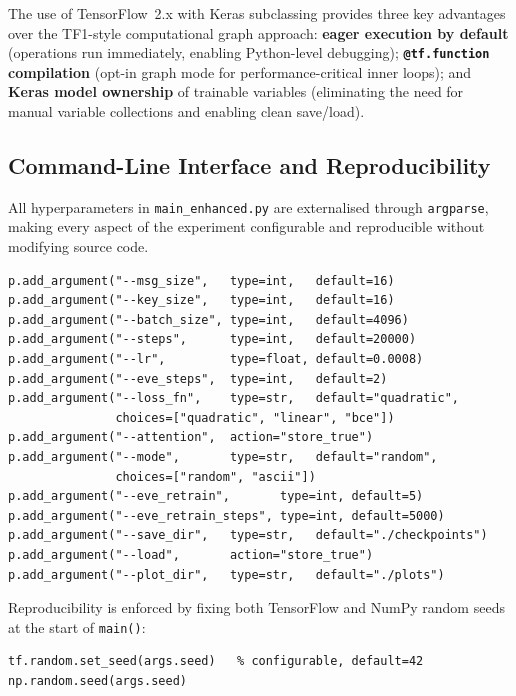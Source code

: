 \documentclass[12pt, a4paper]{article}
\newcommand{\code}[1]{\texttt{\color{CodeRed}#1}}
\begin{document}
\noindent The use of TensorFlow~2.x with Keras subclassing provides
three key advantages over the TF1-style computational graph approach:
\textbf{eager execution by default} (operations run immediately,
enabling Python-level debugging); \textbf{\code{@tf.function}
compilation} (opt-in graph mode for performance-critical inner loops);
and \textbf{Keras model ownership} of trainable variables (eliminating
the need for manual variable collections and enabling clean save/load).

\subsection{Command-Line Interface and Reproducibility}
\label{subsec:cli}

All hyperparameters in \code{main\_enhanced.py} are externalised
through \code{argparse}, making every aspect of the experiment
configurable and reproducible without modifying source code.

\begin{lstlisting}[caption={Key command-line arguments in \code{get\_args()}}]
p.add_argument("--msg_size",   type=int,   default=16)
p.add_argument("--key_size",   type=int,   default=16)
p.add_argument("--batch_size", type=int,   default=4096)
p.add_argument("--steps",      type=int,   default=20000)
p.add_argument("--lr",         type=float, default=0.0008)
p.add_argument("--eve_steps",  type=int,   default=2)
p.add_argument("--loss_fn",    type=str,   default="quadratic",
               choices=["quadratic", "linear", "bce"])
p.add_argument("--attention",  action="store_true")
p.add_argument("--mode",       type=str,   default="random",
               choices=["random", "ascii"])
p.add_argument("--eve_retrain",       type=int, default=5)
p.add_argument("--eve_retrain_steps", type=int, default=5000)
p.add_argument("--save_dir",   type=str,   default="./checkpoints")
p.add_argument("--load",       action="store_true")
p.add_argument("--plot_dir",   type=str,   default="./plots")
\end{lstlisting}

\noindent Reproducibility is enforced by fixing both TensorFlow and
NumPy random seeds at the start of \code{main()}:

\begin{lstlisting}[caption={Random seed fixing for reproducibility}]
tf.random.set_seed(args.seed)   % configurable, default=42
np.random.seed(args.seed)
\end{lstlisting}
\end{document}
